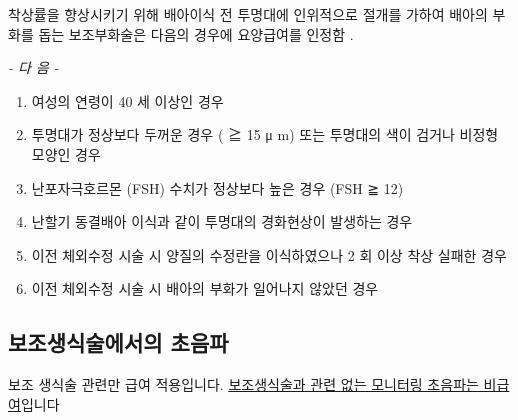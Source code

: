 \par 
착상률을 향상시키기 위해 배아이식 전 투명대에 인위적으로  절개를 가하여 배아의 부화를 돕는 보조부화술은  다음의 경우에 요양급여를 인정함 . \par
\emph{-  다 음  -}\par  
\begin{enumerate}[가.]\tightlist
\item 여성의 연령이  40 세 이상인 경우 
\item 투명대가 정상보다 두꺼운 경우 ( ≧ 15 μ m)  또는 투명대의 색이 검거나 비정형 모양인 경우 
\item 난포자극호르몬 (FSH)  수치가 정상보다 높은 경우 (FSH ≧ 12) 
\item 난할기 동결배아 이식과 같이 투명대의 경화현상이 발생하는 경우 
\item 이전 체외수정 시술 시 양질의 수정란을 이식하였으나  2 회  이상 착상 실패한 경우 
\item 이전 체외수정 시술 시 배아의 부화가 일어나지 않았던 경우
\end{enumerate} 

\subsection{보조생식술에서의 초음파}
보조 생식술 관련만 급여 적용입니다. \uline{보조생식술과 관련 없는 모니터링 초음파는 비급여}입니다

